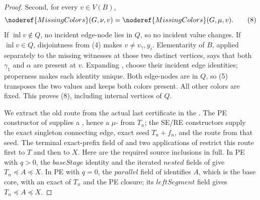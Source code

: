 \begin{proof}
Second, for every \(v\in V(B)\),
\[
              \noderef{MissingColors}(G,\nu,v)
              =\noderef{MissingColors}(G,\mu,v).              \tag{8}
\]
If \(\operatorname{inl}v\notin Q\), no incident edge-node lies in \(Q\),
so no incident value changes.  If \(\operatorname{inl}v\in Q\),
disjointness from (4) makes \(v\ne v_\gamma,y_i\).  Elementarity of
\(B\), applied separately to the missing witnesses at those two distinct
vertices, says that both \(\gamma_1\) and \(\alpha\) are present at
\(v\).  Expanding , choose their incident edge
identities; properness makes each identity unique.  Both edge-nodes are
in \(Q\), so (5) transposes the two values and keeps both colors present.
All other colors are fixed.  This proves (8), including internal vertices
of \(Q\).

We extract the old route from the actual last certificate in the
.  The PE constructor of
 supplies a
, hence a
\(\mu\)- from \(T_n\); the SE/RE
constructors supply the exact singleton connecting edge, exact
 seed \(T_n+f_n\), and the route from
that seed.  The terminal exact-prefix field of
 and two applications of
 restrict this route first
to \(T\) and then to \(X\).  Here are the required source inclusions in
full.  In PE with \(q>0\), the \(\mathit{baseStage}\) identity and the
iterated \(\mathit{nested}\) fields of
 give
\(T_n\preccurlyeq A\preccurlyeq X\).  In PE with \(q=0\), the
\(\mathit{parallel}\) field of  identifies
\(A\), which is the base core, with an exact
 of \(T_n\) and the PE closure; its
\(\mathit{leftSegment}\) field gives
\(T_n\preccurlyeq A\preccurlyeq X\).


\end{proof}
